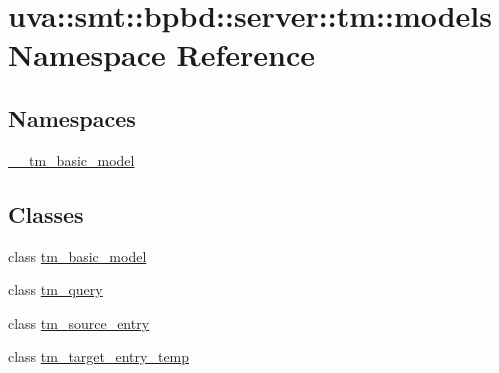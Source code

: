 \hypertarget{namespaceuva_1_1smt_1_1bpbd_1_1server_1_1tm_1_1models}{}\section{uva\+:\+:smt\+:\+:bpbd\+:\+:server\+:\+:tm\+:\+:models Namespace Reference}
\label{namespaceuva_1_1smt_1_1bpbd_1_1server_1_1tm_1_1models}
\subsection*{Namespaces}
\begin{DoxyCompactItemize}
\item 
 \hyperlink{namespaceuva_1_1smt_1_1bpbd_1_1server_1_1tm_1_1models_1_1____tm__basic__model}{\+\_\+\+\_\+tm\+\_\+basic\+\_\+model}
\end{DoxyCompactItemize}
\subsection*{Classes}
\begin{DoxyCompactItemize}
\item 
class \hyperlink{classuva_1_1smt_1_1bpbd_1_1server_1_1tm_1_1models_1_1tm__basic__model}{tm\+\_\+basic\+\_\+model}
\item 
class \hyperlink{classuva_1_1smt_1_1bpbd_1_1server_1_1tm_1_1models_1_1tm__query}{tm\+\_\+query}
\item 
class \hyperlink{classuva_1_1smt_1_1bpbd_1_1server_1_1tm_1_1models_1_1tm__source__entry}{tm\+\_\+source\+\_\+entry}
\item 
class \hyperlink{classuva_1_1smt_1_1bpbd_1_1server_1_1tm_1_1models_1_1tm__target__entry__temp}{tm\+\_\+target\+\_\+entry\+\_\+temp}
\end{DoxyCompactItemize}
